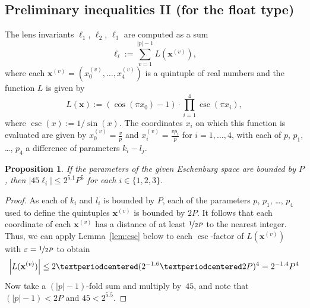 \documentclass{article}
\newtheorem{prop}{Proposition}
\newcommand{\abs}[1]{\left|#1\right|}
\renewcommand{\vec}[1]{\mathbf{#1}}
\begin{document}
\subsection*{Preliminary inequalities II (for the float type)}
The lens invariants \(\ell_1\), \(\ell_2\), \(\ell_3\) are computed as a sum
\begin{equation}\label{eq:ell}
  \ell_i := \sum_{v=1}^{\abs{p}-1} L(\vec x^{(v)}),
\end{equation}
where each \(\vec x^{(v)}=(x_0^{(v)},\dots,x_4^{(v)})\) is a quintuple of real numbers and the function \(L\) is given by
\begin{equation}\label{eq:L}
  L(\vec x) 
  := (\cos(\pi x_0)-1)
  · \textstyle\prod_{i=1}^{4} \csc(\pi x_i),
\end{equation}
where \(\csc(x) := 1/\sin(x)\).
The coordinates \(x_i\) on which this function is evaluated are given by \(x_0^{(v)} = \frac{v}{p}\) and \(x_i^{(v)} = \frac{vp_i}{p}\) for \(i=1,\dots, 4\), with each of \(p\), \(p_1\), \dots, \(p_4\) a difference of parameters \(k_i-l_j\).  

\begin{prop}\label{prop:45ell}
  If the parameters of the given Eschenburg space are bounded by \(P\), then \(\abs{45\ell_i} \leq 2^{5.1} P^5\) for each \(i\in\{1,2,3\}\).
\end{prop}
\begin{proof}
  As each of \(k_i\) and \(l_i\) is bounded by \(P\), each of the parameters \(p\), \(p_1\), \dots, \(p_4\) used to define the quintuples \(\vec x^{(v)}\) is bounded by \(2P\).  It follows that each coordinate of each \(\vec x^{(v)}\) has a distance of at least \(\nicefrac{1}{2P}\) to the nearest integer.  Thus, we can apply Lemma~\ref{lem:csc} below to each \(\csc\)-factor of \(L(\vec x^{(v)})\) with \(\varepsilon = \nicefrac{1}{2P}\) to obtain 
  \[
    \abs{L(\vec x^{(v)})}
    \leq 2·(2^{-1.6}·2P)^4 = 2^{-1.4}P^4\\
  \]
  Now take a \((\abs{p}-1)\)-fold sum and multiply by~\(45\), and note that \((\abs{p}-1) < 2P\) and  \(45 < 2^{5.5}\).
\end{proof}
\end{document}
